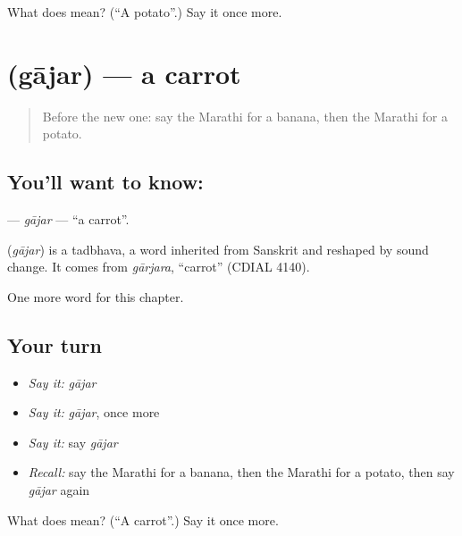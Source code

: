 \begin{tcolorbox}[breakable,colback=teal!4,colframe=teal!35!black,title={Before you move on}]
What does  mean? (\textquotedblleft{}A potato\textquotedblright{}.) Say it once more.
\end{tcolorbox}
\section[\texorpdfstring{\mr{गाजर} (gājar)}{गाजर (gājar)}]{ (gājar) — a carrot}

\label{lesson:MR-C86-gajar}



\begin{quote}
Before the new one: say the Marathi for a banana, then the Marathi for a potato.
\end{quote}

\subsection*{You'll want to know: }
\textbf{} — \emph{gājar} — \textquotedblleft{}a carrot\textquotedblright{}.

\begin{cousinweb}
\textbf{} (\emph{gājar}) is a tadbhava, a word inherited from Sanskrit and reshaped by sound change. It comes from \emph{gārjara}, \textquotedblleft{}carrot\textquotedblright{} (CDIAL 4140).
\end{cousinweb}

\begin{grammarlens}[title={What you've built}]
One more word for this chapter.
\end{grammarlens}

\subsection*{Your turn}
\begin{itemize}
\raggedright
  \item \emph{Say it:} \emph{gājar}
  \item \emph{Say it:} \emph{gājar}, once more
  \item \emph{Say it:} say \emph{gājar}
  \item \emph{Recall:} say the Marathi for a banana, then the Marathi for a potato, then say \emph{gājar} again
\end{itemize}

\begin{tcolorbox}[breakable,colback=teal!4,colframe=teal!35!black,title={Before you move on}]
What does  mean? (\textquotedblleft{}A carrot\textquotedblright{}.) Say it once more.
\end{tcolorbox}
